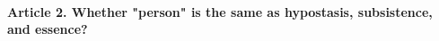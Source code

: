 \documentclass{ucetd}
\begin{document}
\paragraph{Article 2. Whether "person" is the same as hypostasis, subsistence, and essence?}
\end{document}
